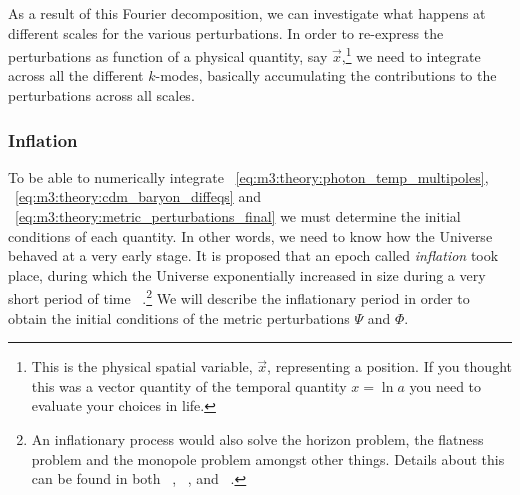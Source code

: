     As a result of this Fourier decomposition, we can investigate what happens at different scales for the various perturbations. In order to re-express the perturbations as function of a physical quantity, say $\vec{x}$,\footnote{This is the physical spatial variable, $\vec{x}$, representing a position. If you thought this was a vector quantity of the temporal quantity $x=\ln{a}$ you need to evaluate your choices in life.} we need to integrate across all the different $k$-modes, basically accumulating the contributions to the perturbations across all scales. 


\subsubsection{Inflation}
    To be able to numerically integrate ~\cref{eq:m3:theory:photon_temp_multipoles}, ~\cref{eq:m3:theory:cdm_baryon_diffeqs} and ~\cref{eq:m3:theory:metric_perturbations_final} we must determine the initial conditions of each quantity. In other words, we need to know how the Universe behaved at a very early stage. It is proposed that an epoch called \textit{inflation} took place, during which the Universe exponentially increased in size during a very short period of time ~\cite{dodelson2020modern}.\footnote{An inflationary process would also solve the horizon problem, the flatness problem and the monopole problem amongst other things. Details about this can be found in both ~\cite{dodelson2020modern}, ~\cite{carroll_2019}, and ~\cite{weinberg2008cosmology}.} We will describe the inflationary period in order to obtain the initial conditions of the metric perturbations $\Psi$ and $\Phi$. 

